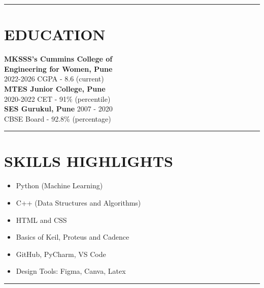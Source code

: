 \documentclass[a4paper,10pt]{article}
\begin{document}
\begin{paracol}{2} 

	\begin{leftcolumn*}
	\vspace{2em}
	\hrule
	\section*{EDUCATION}
	\textbf{MKSSS's Cummins College of \\Engineering for Women, Pune} \\
		\vspace{1em}
	2022-2026  CGPA - 8.6 (current) \\
	\textbf{MTES Junior College, Pune} \\
		\vspace{1em}
	2020-2022  CET - 91\% (percentile) \\
	\textbf{SES Gurukul, Pune}  2007 - 2020 \\
		\vspace{1em}
	CBSE Board - 92.8\% (percentage) \\
	\vspace{0.1em}
	\hrule
	\section*{SKILLS HIGHLIGHTS}
	\begin{itemize}
		\item Python (Machine Learning)
		\item C++ (Data Structures and Algorithms)
		\item HTML and CSS
		\item Basics of Keil, Proteus and Cadence
		\item GitHub, PyCharm, VS Code
		\item Design Tools: Figma, Canva, Latex
	\end{itemize}
	\vspace{0.1em}
	\hrule

\end{leftcolumn*}
\end{paracol}
\end{document}

